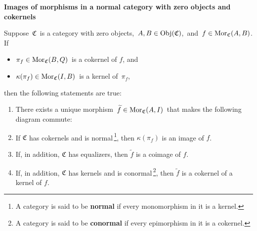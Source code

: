 
\vskip 1.0cm
\noindent
\textbf{\large Images of morphisms in a normal category with zero objects and cokernels}


\vskip 0.5cm
\begin{proposition}
\mbox{}
\vskip 0.1cm
\noindent
Suppose \,$\mathfrak{C}$\, is a category with zero objects,
\,$A, B \in \textnormal{Obj}(\mathfrak{C})$,\, and
\,$f \in \textnormal{Mor}_{\mathfrak{C}}(A,B)$.
If
\begin{itemize}
\item
	$\pi_{f} \in \textnormal{Mor}_{\mathfrak{C}}(B,Q)$\, is a cokernel of $f$, and
\item
	$\kappa(\pi_{f}) \in \textnormal{Mor}_{\mathfrak{C}}(I,B)$\, is a kernel of \,$\pi_{f}$,
\end{itemize}
then the following statements are true:
\begin{enumerate}
\item
	There exists a unique morphism \,$\widetilde{f} \in \textnormal{Mor}_{\mathfrak{C}}(A,I)$\,
	that makes the following diagram commute: %
	\begin{center}
	\end{center}
\item
	If $\mathfrak{C}$ has cokernels and is
	normal\,\footnote{A category is said to be \textbf{normal} if every monomorphism in it is a kernel.},
	then $\kappa(\pi_{f})$ is an image of $f$.
\item
	If, in addition, $\mathfrak{C}$ has equalizers, then $\widetilde{f}$ is a coimage of $f$.
\item
	If, in addition, $\mathfrak{C}$ has kernels and is
	conormal\,\footnote{A category is said to be \textbf{conormal} if every epimorphism in it is a cokernel.},
	then $\widetilde{f}$ is a cokernel of a kernel of $f$.
\end{enumerate}
\end{proposition}
